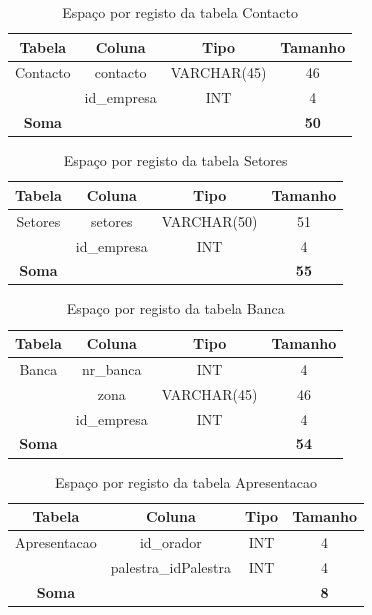 \documentclass[12pt,a4paper]{article}
\renewcommand{\arraystretch}{1.5}  %
\begin{document}
\begin{table}[H]
\centering
\renewcommand{\arraystretch}{1.2}
\begin{tabular}{|c|c|c|c|}
\hline
\textbf{Tabela} & \textbf{Coluna} & \textbf{Tipo} & \textbf{Tamanho} \\ \hline
Contacto & contacto & VARCHAR(45) & 46 \\ \hline
& id\_empresa & INT & 4 \\ \hline
\textbf{Soma} & & & \textbf{50} \\ \hline
\end{tabular}
\caption{Espaço por registo da tabela Contacto}
\end{table}

\begin{table}[H]
\centering
\renewcommand{\arraystretch}{1.2}
\begin{tabular}{|c|c|c|c|}
\hline
\textbf{Tabela} & \textbf{Coluna} & \textbf{Tipo} & \textbf{Tamanho} \\ \hline
Setores & setores & VARCHAR(50) & 51 \\ \hline
& id\_empresa & INT & 4 \\ \hline
\textbf{Soma} & & & \textbf{55} \\ \hline
\end{tabular}
\caption{Espaço por registo da tabela Setores}
\end{table}

\begin{table}[H]
\centering
\renewcommand{\arraystretch}{1.2}
\begin{tabular}{|c|c|c|c|}
\hline
\textbf{Tabela} & \textbf{Coluna} & \textbf{Tipo} & \textbf{Tamanho} \\ \hline
Banca & nr\_banca & INT & 4 \\ \hline
& zona & VARCHAR(45) & 46 \\ \hline
& id\_empresa & INT & 4 \\ \hline
\textbf{Soma} & & & \textbf{54} \\ \hline
\end{tabular}
\caption{Espaço por registo da tabela Banca}
\end{table}

\begin{table}[H]
\centering
\renewcommand{\arraystretch}{1.2}
\begin{tabular}{|c|c|c|c|}
\hline
\textbf{Tabela} & \textbf{Coluna} & \textbf{Tipo} & \textbf{Tamanho} \\ \hline
Apresentacao & id\_orador & INT & 4 \\ \hline
& palestra\_idPalestra & INT & 4 \\ \hline
\textbf{Soma} & & & \textbf{8} \\ \hline
\end{tabular}
\caption{Espaço por registo da tabela Apresentacao}
\end{table}
\end{document}
